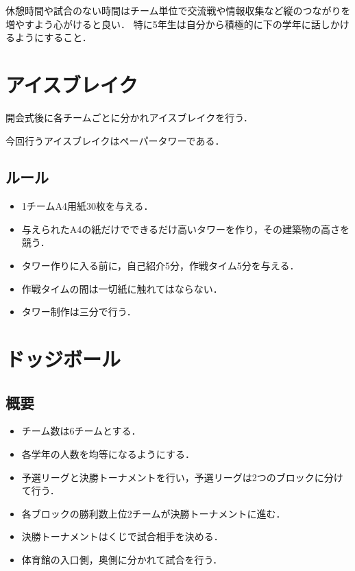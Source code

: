 \documentclass[dvipdfmx]{jsarticle}
\begin{document}
休憩時間や試合のない時間はチーム単位で交流戦や情報収集など縦のつながりを増やすよう心がけると良い．
特に5年生は自分から積極的に下の学年に話しかけるようにすること．

\section{アイスブレイク}
開会式後に各チームごとに分かれアイスブレイクを行う．

今回行うアイスブレイクはペーパータワーである．
\subsection{ルール}
\begin{itemize}
  \item 1チームA4用紙30枚を与える．
  \item 与えられたA4の紙だけでできるだけ高いタワーを作り，その建築物の高さを競う．
  \item タワー作りに入る前に，自己紹介5分，作戦タイム5分を与える．
  \item 作戦タイムの間は一切紙に触れてはならない．
  \item タワー制作は三分で行う．
\end{itemize}


\section{ドッジボール}
\subsection{概要}
\begin{itemize}
  \item チーム数は6チームとする．
  \item 各学年の人数を均等になるようにする．
  \item 予選リーグと決勝トーナメントを行い，予選リーグは2つのブロックに分けて行う．
  \item 各ブロックの勝利数上位2チームが決勝トーナメントに進む．
  \item 決勝トーナメントはくじで試合相手を決める．
  \item 体育館の入口側，奥側に分かれて試合を行う．
\end{itemize}
\end{document}
